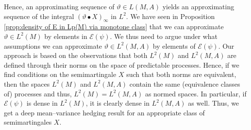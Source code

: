 \documentclass[11pt,a4paper,twoside,openany]{report}
\numberwithin{equation}{section}
\theoremstyle{plain} %
\theoremstyle{definition} %
\theoremstyle{remark} %
\begin{document}
 Hence, an approximating sequence of \(\vartheta\in L(M,A)\) yields an approximating sequence of the integral \((\vartheta\bullet X)_{\infty}\) in \(L^2\). We have seen in Proposition \ref{prop:density of E in Lp(M) via monotone class} that we can approximate \(\vartheta\in L^2(M)\) by elements in \(\mathcal{E}(\psi)\). We thus need to argue under what assumptions we can approximate \(\vartheta\in L^2(M,A)\) by elements of \(\mathcal{E}(\psi)\). Our approach is based on the observations that both \(L^2(M)\) and  \(L^2(M,A)\) are defined through their norms on the space of predictable processes. Hence, if we find conditions on the semimartingale \(X\) such that both norms are equivalent, then the spaces \(L^2(M)\) and \(L^2(M,A)\) contain the same (equivalence classes of) processes and thus, \(L^2(M)=L^2(M,A)\) as normed spaces. In particular, if \(\mathcal{E}(\psi)\) is dense in \(L^2(M)\), it is clearly dense in \(L^2(M,A)\) as well. Thus, we get a deep mean--variance hedging result for an appropriate class of semimartingales \(X\). 
\end{document}
